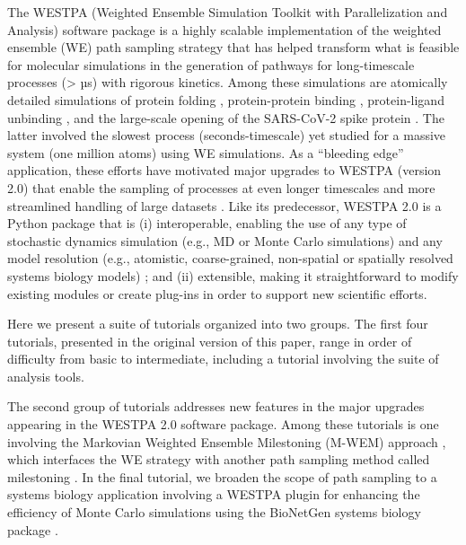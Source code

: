 The WESTPA (Weighted Ensemble Simulation Toolkit with Parallelization and Analysis) software package \citep{Zwier2015,russo_westpa_2022} is a highly scalable implementation of the weighted ensemble (WE) path sampling strategy \citep{huber_weighted-ensemble_1996,zuckerman_weighted_2017} that has helped transform what is feasible for molecular simulations in the generation of pathways for long-timescale processes (> µs) with rigorous kinetics.
Among these simulations are atomically detailed simulations of protein folding \citep{adhikari_computational_2019}, protein-protein binding \citep{saglam_proteinprotein_2019}, protein-ligand unbinding \citep{lotz_unbiased_2018}, and the large-scale opening of the SARS-CoV-2 spike protein \citep{sztain_glycan_2021}. 
The latter involved the slowest process (seconds-timescale) yet studied for a massive system (one million atoms) using WE simulations. 
As a “bleeding edge” application, these efforts have motivated major upgrades to WESTPA (version 2.0) that enable the sampling of processes at even longer timescales and more streamlined handling of large datasets \citep{russo_westpa_2022}. 
Like its predecessor, WESTPA 2.0 is a Python package that is (i) interoperable, enabling the use of any type of stochastic dynamics simulation (e.g., MD or Monte Carlo simulations) and any model resolution (e.g., atomistic, coarse-grained, non-spatial or spatially resolved systems biology models) \citep{donovan_efficient_2013,donovan_unbiased_2016}; and (ii) extensible, making it straightforward to modify existing modules or create plug-ins in order to support new scientific efforts. 

Here we present a suite of tutorials organized into two groups.
The first four tutorials, presented in the original version of this paper, range in order of difficulty from basic to intermediate, including a tutorial involving the suite of analysis tools. 

The second group of tutorials addresses new features in the major upgrades appearing in the WESTPA 2.0 software package. 
Among these tutorials is one involving the Markovian Weighted Ensemble Milestoning (M-WEM) approach \citep{Ray2022Markovian}, which interfaces the WE strategy with another path sampling method called milestoning \citep{Faradjian2004Computing,West2007Extending}. 
In the final tutorial, we broaden the scope of path sampling to a systems biology application involving a WESTPA plugin for enhancing the efficiency of Monte Carlo simulations using the BioNetGen systems biology package \citep{harris_bionetgen_2016, tapia_mcell-r_2019}. 


